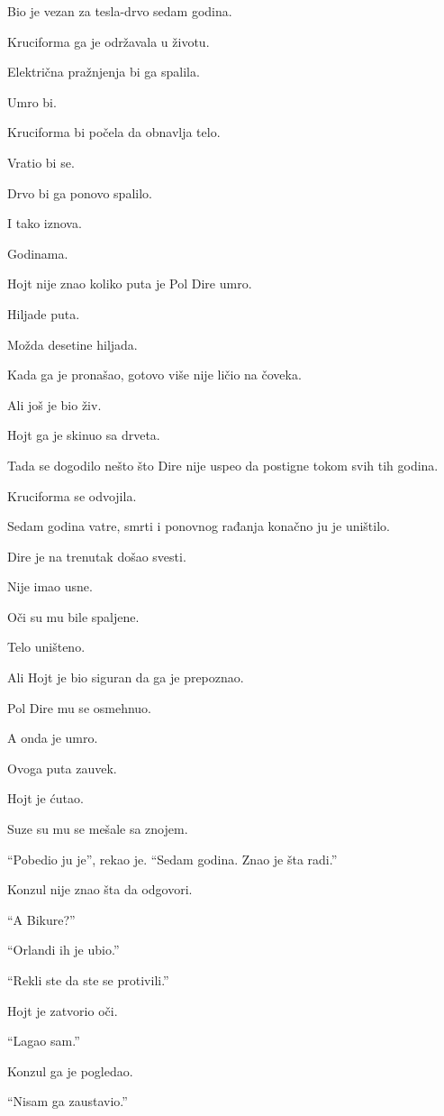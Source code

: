 Bio je vezan za tesla-drvo sedam godina.

Kruciforma ga je održavala u životu.

Električna pražnjenja bi ga spalila.

Umro bi.

Kruciforma bi počela da obnavlja telo.

Vratio bi se.

Drvo bi ga ponovo spalilo.

I tako iznova.

Godinama.

Hojt nije znao koliko puta je Pol Dire umro.

Hiljade puta.

Možda desetine hiljada.

Kada ga je pronašao, gotovo više nije ličio na čoveka.

Ali još je bio živ.

Hojt ga je skinuo sa drveta.

Tada se dogodilo nešto što Dire nije uspeo da postigne tokom svih tih godina.

Kruciforma se odvojila.

Sedam godina vatre, smrti i ponovnog rađanja konačno ju je uništilo.

Dire je na trenutak došao svesti.

Nije imao usne.

Oči su mu bile spaljene.

Telo uništeno.

Ali Hojt je bio siguran da ga je prepoznao.

Pol Dire mu se osmehnuo.

A onda je umro.

Ovoga puta zauvek.

Hojt je ćutao.

Suze su mu se mešale sa znojem.

``Pobedio ju je'', rekao je. ``Sedam godina. Znao je šta radi.''

Konzul nije znao šta da odgovori.

``A Bikure?''

``Orlandi ih je ubio.''

``Rekli ste da ste se protivili.''

Hojt je zatvorio oči.

``Lagao sam.''

Konzul ga je pogledao.

``Nisam ga zaustavio.''

